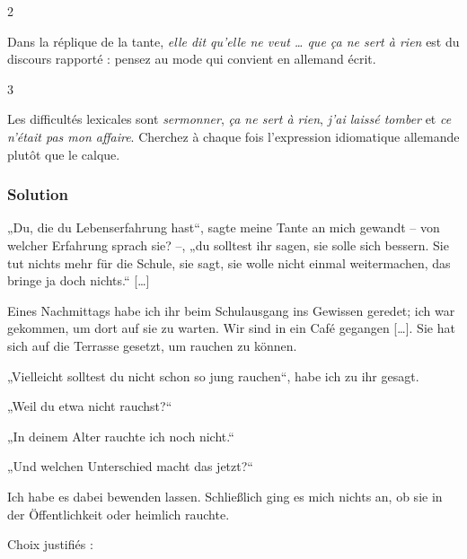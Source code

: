 \documentclass[11pt,a4paper]{article}
\begin{document}
\begin{indication}{2}

Dans la réplique de la tante, \emph{elle dit qu'elle ne veut \ldots{} que ça ne sert à rien} est du discours rapporté : pensez au mode qui convient en allemand écrit.

\end{indication}

\begin{indication}{3}

Les difficultés lexicales sont \emph{sermonner}, \emph{ça ne sert à rien}, \emph{j'ai laissé tomber} et \emph{ce n'était pas mon affaire}. Cherchez à chaque fois l'expression idiomatique allemande plutôt que le calque.

\end{indication}

\hypertarget{solution-2}{%
\subsubsection{Solution}\label{solution-2}}

„Du, die du Lebenserfahrung hast``, sagte meine Tante an mich gewandt -- von welcher Erfahrung sprach sie? --, „du solltest ihr sagen, sie solle sich bessern. Sie tut nichts mehr für die Schule, sie sagt, sie wolle nicht einmal weitermachen, das bringe ja doch nichts.`` {[}\ldots{]}

Eines Nachmittags habe ich ihr beim Schulausgang ins Gewissen geredet; ich war gekommen, um dort auf sie zu warten. Wir sind in ein Café gegangen {[}\ldots{]}. Sie hat sich auf die Terrasse gesetzt, um rauchen zu können.

„Vielleicht solltest du nicht schon so jung rauchen``, habe ich zu ihr gesagt.

„Weil du etwa nicht rauchst?{}``

„In deinem Alter rauchte ich noch nicht.``

„Und welchen Unterschied macht das jetzt?{}``

Ich habe es dabei bewenden lassen. Schließlich ging es mich nichts an, ob sie in der Öffentlichkeit oder heimlich rauchte.

Choix justifiés :
\end{document}

